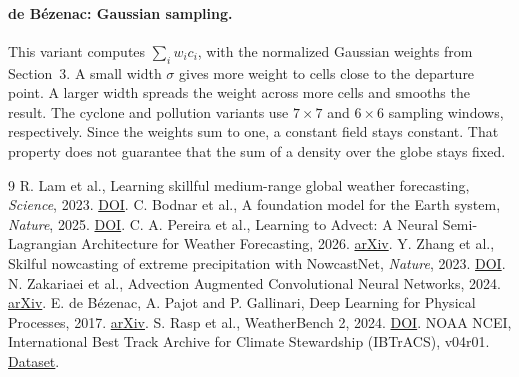 \documentclass[10pt,a4paper]{article}
\begin{document}
\paragraph{de B\'ezenac: Gaussian sampling.}
This variant computes \(\sum_i w_i c_i\), with the normalized Gaussian weights from Section~3. A small width \(\sigma\) gives more weight to cells close to the departure point. A larger width spreads the weight across more cells and smooths the result. The cyclone and pollution variants use \(7\times7\) and \(6\times6\) sampling windows, respectively. Since the weights sum to one, a constant field stays constant. That property does not guarantee that the sum of a density over the globe stays fixed.


\begin{thebibliography}{9}
 R. Lam et al., Learning skillful medium-range global weather forecasting, \emph{Science}, 2023. \href{https://doi.org/10.1126/science.adi2336}{DOI}.
 C. Bodnar et al., A foundation model for the Earth system, \emph{Nature}, 2025. \href{https://doi.org/10.1038/s41586-025-09005-y}{DOI}.
 C. A. Pereira et al., Learning to Advect: A Neural Semi-Lagrangian Architecture for Weather Forecasting, 2026. \href{https://arxiv.org/abs/2601.21151}{arXiv}.
 Y. Zhang et al., Skilful nowcasting of extreme precipitation with NowcastNet, \emph{Nature}, 2023. \href{https://doi.org/10.1038/s41586-023-06184-4}{DOI}.
 N. Zakariaei et al., Advection Augmented Convolutional Neural Networks, 2024. \href{https://arxiv.org/abs/2406.19253}{arXiv}.
 E. de B\'ezenac, A. Pajot and P. Gallinari, Deep Learning for Physical Processes, 2017. \href{https://arxiv.org/abs/1711.07970}{arXiv}.
 S. Rasp et al., WeatherBench 2, 2024. \href{https://doi.org/10.1029/2023MS004019}{DOI}.
 NOAA NCEI, International Best Track Archive for Climate Stewardship (IBTrACS), v04r01. \href{https://www.ncei.noaa.gov/products/international-best-track-archive}{Dataset}.
\end{thebibliography}
\end{document}
